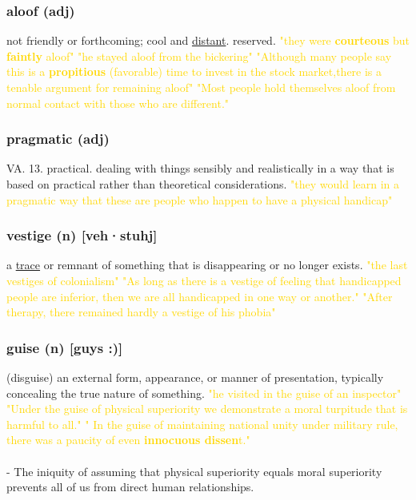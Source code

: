 \documentclass{proc}
\begin{document}
	\subsubsection{\textcolor{brickred}{aloof} (adj)}
	not friendly or forthcoming; cool and \underline{distant}. reserved.
	\textcolor{gold}{"they were \textbf{courteous} but \textbf{faintly} aloof" "he stayed aloof from the bickering" "Although many people say this is a \textbf{propitious} (favorable) time to invest in the stock market,there is a tenable argument for remaining aloof" "Most people hold themselves aloof from normal contact with those who are different."}
	
	\subsubsection{\textcolor{brickred}{pragmatic} (adj)}
	VA. 13. practical. dealing with things sensibly and realistically in a way that is based on practical rather than theoretical considerations.
	\textcolor{gold}{ "they would learn in a pragmatic way that these are people who happen to have a physical handicap"}
	
	\subsubsection{\textcolor{brickred}{vestige} (n) [veh·stuhj]}
	a \underline{trace} or remnant of something that is disappearing or no longer exists.
	\textcolor{gold}{"the last vestiges of colonialism" "As long as there is a vestige of feeling that handicapped people are inferior, then we are all handicapped in one way or another." "After therapy, there remained hardly a vestige of his phobia"}
	
	\subsubsection{\textcolor{brickred}{guise} (n) [guys :)]}
	(disguise) an external form, appearance, or manner of presentation, typically concealing the true nature of something.
	\textcolor{gold}{"he visited in the guise of an inspector" "Under the guise of physical superiority we demonstrate a moral turpitude that is harmful to all." " In the guise of maintaining national unity under military rule, there was a paucity of even \textbf{innocuous dissen}t."}\\\\
	- The iniquity of assuming that physical superiority equals moral superiority prevents all of us from direct human relationships.
	
\end{document}
